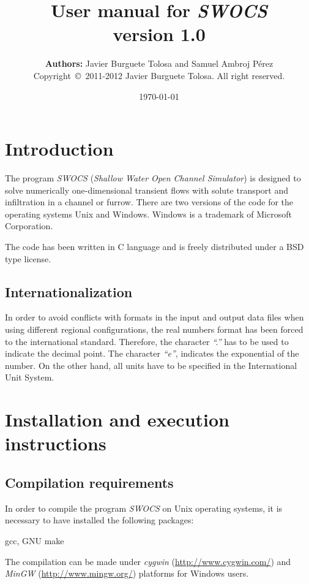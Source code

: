 \documentclass[a4paper,12pt]{report}
\title
{
	{\bf\Large User manual for \emph{SWOCS}}\\
	{\large	version 1.0}
}
\author
{
	{\bf Authors:} Javier Burguete Tolosa and Samuel Ambroj Pérez\\
	{\small Copyright~\copyright~2011-2012 Javier Burguete Tolosa.
	 All right reserved.}
}
\date{\today}
\newcommand{\swocs}{\emph{SWOCS}}
\newcommand{\IT}[1]{{\sl ``#1''}}
\begin{document}
\maketitle

\tableofcontents

\setlength{\parskip}{\baselineskip / 2}

\chapter{Introduction}

The program {\swocs} (\emph{Shallow Water Open Channel Simulator}) is designed
to solve numerically one-dimensional transient flows with solute transport and
infiltration in a channel or furrow. There are two versions of the code for the
operating systems Unix and Windows. Windows is a trademark of Microsoft
Corporation.

The code has been written in C language and is freely distributed under a BSD
type license.

\section{Internationalization}

In order to avoid conflicts with formats in the input and output data files when
using different regional configurations, the real numbers format has been forced
to the international standard. Therefore, the character \IT{.} has to be used to
indicate the decimal point. The character \IT{e}, indicates the exponential of
the number. On the other hand, all units have to be specified in the
International Unit System.

\chapter{Installation and execution instructions}

\section{Compilation requirements}

In order to compile the program {\swocs} on Unix operating systems, it is
necessary to have installed the following packages:
\begin{verbatimtab}
	gcc, GNU make
\end{verbatimtab}
The compilation can be made under \emph{cygwin} (\url{http://www.cygwin.com/})
and \emph{MinGW} (\url{http://www.mingw.org/}) platforms for Windows users.
\end{document}
